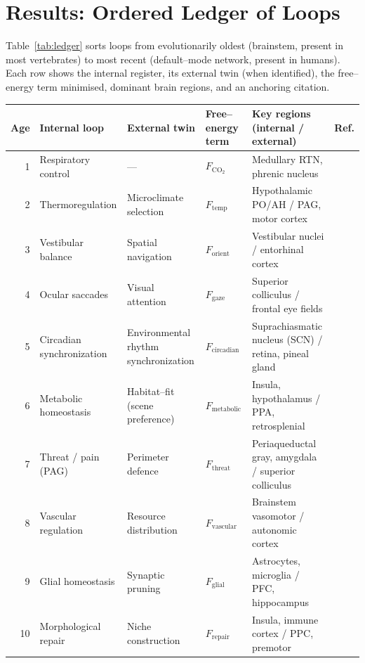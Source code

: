 \documentclass[11pt]{article}
\begin{document}
\section{Results: Ordered Ledger of Loops}
Table~\ref{tab:ledger} sorts loops from evolutionarily oldest (brainstem, present in most vertebrates) to most recent (default--mode network, present in humans).  
Each row shows the internal register, its external twin (when identified), the free--energy term minimised, dominant brain regions, and an anchoring citation.

\begin{table}[ht]
\centering
\small
\begin{tabular}{@{}r p{3.0cm} p{3.0cm} p{2.3cm} p{3.5cm} p{1.2cm}@{}}
\toprule
\textbf{Age} & \textbf{Internal loop} & \textbf{External twin} & \textbf{Free--energy term} & \textbf{Key regions (internal / external)} & \textbf{Ref.}\\
\midrule
1 & Respiratory control & --- & $F_{\text{CO}_2}$ & Medullary RTN, phrenic nucleus & \cite{guyenet2015co2}\\
2 & Thermoregulation & Microclimate selection & $F_{\text{temp}}$ & Hypothalamic PO/AH / PAG, motor cortex & \cite{tan2016warm}\\
3 & Vestibular balance & Spatial navigation & $F_{\text{orient}}$ & Vestibular nuclei / entorhinal cortex & \cite{angelaki2022vestibular}\\
4 & Ocular saccades & Visual attention & $F_{\text{gaze}}$ & Superior colliculus / frontal eye fields & \cite{white2022saccade}\\
5 & Circadian synchronization & Environmental rhythm synchronization & $F_{\text{circadian}}$ & Suprachiasmatic nucleus (SCN) / retina, pineal gland & \cite{patton2023circadian}\\
6 & Metabolic homeostasis & Habitat--fit (scene preference) & $F_{\text{metabolic}}$ & Insula, hypothalamus / PPA, retrosplenial & \cite{karraza2024metabolic}\\
7 & Threat / pain (PAG) & Perimeter defence & $F_{\text{threat}}$ & Periaqueductal gray, amygdala / superior colliculus & \cite{zhang2023pag}\\
8 & Vascular regulation & Resource distribution & $F_{\text{vascular}}$ & Brainstem vasomotor / autonomic cortex & \cite{iadecola2023vascular}\\
9 & Glial homeostasis & Synaptic pruning & $F_{\text{glial}}$ & Astrocytes, microglia / PFC, hippocampus & \cite{freeman2023glial}\\
10 & Morphological repair & Niche construction & $F_{\text{repair}}$ & Insula, immune cortex / PPC, premotor & \cite{koren2021immune}\\

\end{tabular}
\end{table}
\end{document}
